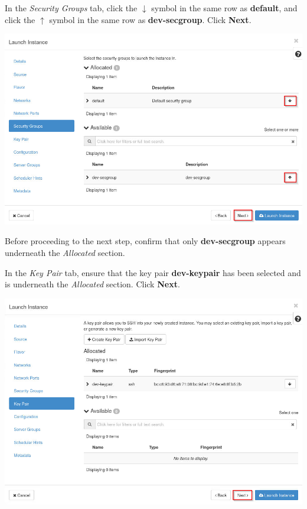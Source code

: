 \documentclass[letterpaper, 12pt]{article}
\begin{document}
\begin{enumerate}
    \begin{labstep}
        In the \textit{Security Groups} tab, click the $\downarrow$ symbol in the same row as \textbf{default}, and click the $\uparrow$ symbol in the same row as \textbf{dev-secgroup}.
        Click \textbf{Next}.

        \begin{center}
            \includegraphics[width=\linewidth]{images/part2/step8.png}
        \end{center}
    \end{labstep}

    \begin{stopbox}
        Before proceeding to the next step, confirm that only \textbf{dev-secgroup} appears underneath the \textit{Allocated} section.
    \end{stopbox}

    \begin{labstep}
        In the \textit{Key Pair} tab, ensure that the key pair \textbf{dev-keypair} has been selected and is underneath the \textit{Allocated} section.
        Click \textbf{Next}.

        \begin{center}
            \includegraphics[width=\linewidth]{images/part2/step9.png}
        \end{center}
    \end{labstep}


\end{enumerate}
\end{document}
